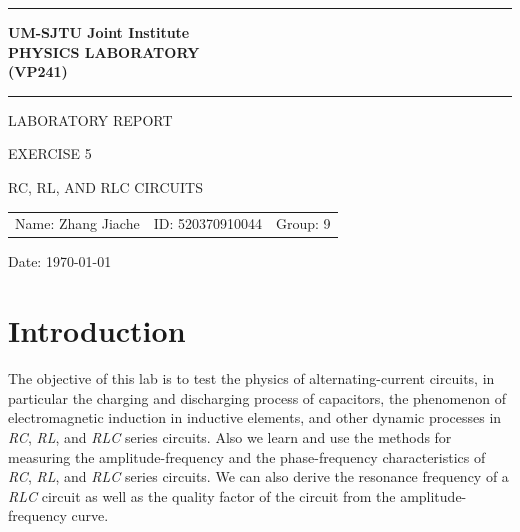 \documentclass[12pt, a4paper]{article}
\begin{document}
\pagestyle{plain}

\begin{titlepage}

	\begin{center}	

	\vspace{10ex}

	\hrule

	\vspace{2ex}

	\textbf{\Large{UM-SJTU} \Large{J}\large{oint} \Large{I}\large{nstitute} \\
	\Large{P}\large{HYSICS} \Large{L}\large{ABORATORY} \\
	\large{(}\Large{V}\large{P241)}}\\
	
	\vspace{2ex}

	\hrule
	
	\vspace{25ex}
	
	\Large{L}\large{ABORATORY} \Large{R}\large{EPORT}

	\vspace{6ex}

	\large{E}\normalsize{XERCISE 5}

	\vspace{4ex}

	\large RC, RL, \normalsize AND \large RLC C\normalsize IRCUITS

	\vspace{4ex}

	\begin{center}
		\begin{tabular}{lll}
		Name: Zhang Jiache & ID: 520370910044 & Group: 9
		\end{tabular}
	\end{center}

	{\large Date: \today}
	
	\end{center}
	
\end{titlepage}

\newpage

\section{Introduction}
The objective of this lab is to test the physics of alternating-current 
circuits, in particular the charging and discharging process of capacitors, the phenomenon
of electromagnetic induction in inductive elements, and other dynamic processes in 
\textit{RC}, \textit{RL}, and \textit{RLC} series circuits. Also we learn and use the methods for measuring the 
amplitude-frequency and the phase-frequency characteristics of \textit{RC}, \textit{RL}, and \textit{RLC} series 
circuits. We can also derive the resonance frequency of a \textit{RLC} circuit as well as the quality 
factor of the circuit from the amplitude-frequency curve.
\end{document}
